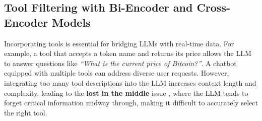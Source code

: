 \documentclass[runningheads]{llncs}
\begin{document}
\subsection{Tool Filtering with Bi-Encoder and Cross-Encoder Models}
\label{sec:tool_filtering}
Incorporating tools is essential for bridging LLMs with real-time data. For example, a tool that accepts a token name and returns its price allows the LLM to answer questions like \textit{``What is the current price of Bitcoin?''}. A chatbot equipped with multiple tools can address diverse user requests. However, integrating too many tool descriptions into the LLM increases context length and complexity, leading to the \textbf{lost in the middle} issue \cite{liu-etal-2024-lost}, where the LLM tends to forget critical information midway through, making it difficult to accurately select the right tool.





\end{document}
